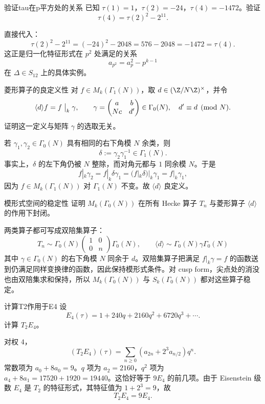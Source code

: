 \begin{problem}{验证tau在p平方处的关系}
已知 $\tau(1)=1$，$\tau(2)=-24$，$\tau(4)=-1472$。验证
\[
\tau(4)=\tau(2)^2-2^{11}.
\]
\end{problem}
\begin{solution}
直接代入：
\[
\tau(2)^2-2^{11}=(-24)^2-2048=576-2048=-1472=\tau(4).
\]
这正是归一化特征形式在 $p^2$ 处满足的关系
\[
a_{p^2}=a_p^2-p^{k-1}
\]
在 $\Delta\in S_{12}$ 上的具体实例。
\end{solution}

\begin{problem}{菱形算子的良定义性}
对 $f\in M_k(\Gamma_1(N))$，取 $d\in(\Z/N\Z)^\times$，并令
\[
\langle d\rangle f=f\bigm|_k\gamma,
\qquad
\gamma=\begin{pmatrix}a&b\\Nc&d'\end{pmatrix}\in\Gamma_0(N),
\quad d'\equiv d\pmod N.
\]
证明这一定义与矩阵 $\gamma$ 的选取无关。
\end{problem}
\begin{solution}
若 $\gamma_1,\gamma_2\in\Gamma_0(N)$ 具有相同的右下角模 $N$ 余类，则
\[
\delta:=\gamma_2\gamma_1^{-1}\in\Gamma_1(N).
\]
事实上，$\delta$ 的左下角仍被 $N$ 整除，而对角元都与 $1$ 同余模 $N$。于是
\[
f|_k\gamma_2=f|_k\delta\gamma_1=(f|_k\delta)|_k\gamma_1=f|_k\gamma_1,
\]
因为 $f\in M_k(\Gamma_1(N))$ 对 $\Gamma_1(N)$ 不变。故 $\langle d\rangle$ 良定义。
\end{solution}

\begin{problem}{模形式空间的稳定性}
证明 $M_k(\Gamma_0(N))$ 在所有 Hecke 算子 $T_n$ 与菱形算子 $\langle d\rangle$ 的作用下封闭。
\end{problem}
\begin{solution}
两类算子都可写成双陪集算子：
\[
T_n\sim \Gamma_0(N)\begin{pmatrix}1&0\\0&n\end{pmatrix}\Gamma_0(N),
\qquad
\langle d\rangle\sim \Gamma_0(N)\gamma\Gamma_0(N)
\]
其中 $\gamma\in\Gamma_0(N)$ 的右下角模 $N$ 同余于 $d$。双陪集算子把满足 $f|_k\gamma=f$ 的函数送到仍满足同样变换律的函数，因此保持模形式条件。对 cusp form，尖点处的消没也由双陪集求和保持，所以 $M_k(\Gamma_0(N))$ 与 $S_k(\Gamma_0(N))$ 都对这些算子稳定。
\end{solution}

\begin{problem}{计算T2作用于E4}
设
\[
E_4(\tau)=1+240q+2160q^2+6720q^3+\cdots.
\]
计算 $T_2E_4$。
\end{problem}
\begin{solution}
对权 $4$，
\[
(T_2E_4)(\tau)=\sum_{n\ge0}(a_{2n}+2^3a_{n/2})q^n.
\]
常数项为 $a_0+8a_0=9$。$q$ 项为 $a_2=2160$，$q^2$ 项为 $a_4+8a_1=17520+1920=19440$。这恰好等于 $9E_4$ 的前几项。由于 Eisenstein 级数 $E_4$ 是 $T_2$ 的特征形式，其特征值为 $1+2^3=9$，故
\[
T_2E_4=9E_4.
\]
\end{solution}

